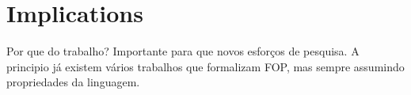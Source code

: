 \section{Implications}\label{seq:impl}
Por que do trabalho?
Importante para que novos esforços de pesquisa.
A principio já existem vários trabalhos que formalizam FOP, mas sempre assumindo propriedades
da linguagem. 

